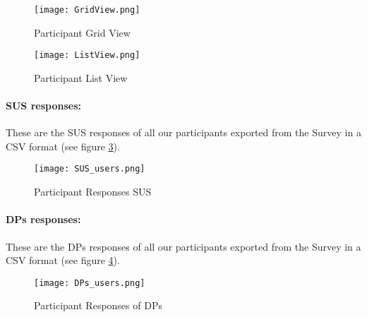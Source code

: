 \begin{figure}[ht]
    \centering
    \texttt{[image: GridView.png]}
    \caption[Example Prototype]{Participant Grid View}
    \label{appendix:fig:gridview}
\end{figure}

\begin{figure}[ht]
    \centering
    \texttt{[image: ListView.png]}
    \caption[Example Prototype]{Participant List View}
    \label{appendix:fig:listview}
\end{figure}

\paragraph{SUS responses:}
These are the SUS responses of all our participants exported from the Survey in a CSV format (see figure \ref{appendix:fig:sus_responses}).
\begin{figure}[ht]
    \centering
    \texttt{[image: SUS\_users.png]}
    \caption[SUS Responses]{Participant Responses SUS}
    \label{appendix:fig:sus_responses}
\end{figure}
\paragraph{DPs responses:}
These are the DPs responses of all our participants exported from the Survey in a CSV format (see figure \ref{appendix:fig:dps_responses}).
\begin{figure}[ht]
    \centering
    \texttt{[image: DPs\_users.png]}
    \caption[DPs Responses]{Participant Responses of DPs}
    \label{appendix:fig:dps_responses}
\end{figure}